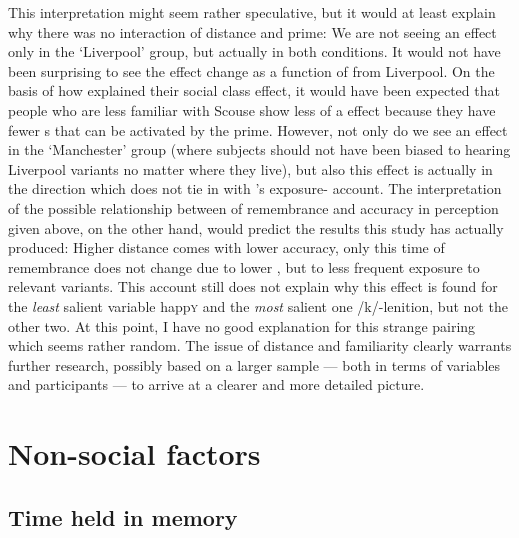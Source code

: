 This interpretation might seem rather speculative, but it would at least explain why there was no interaction of distance and prime: We are not seeing an effect only in the `Liverpool' group, but actually in both conditions.
It would not have been surprising to see the  effect change as a function of  from Liverpool.
On the basis of how \textcite{haydrager2010} explained their social class effect, it would have been expected that people who are less familiar with Scouse show less of a  effect because they have fewer s that can be activated by the prime.
However, not only do we see an effect in the `Manchester' group (where subjects should not have been biased to hearing Liverpool variants no matter where they live), but also this effect is actually in the direction which does not tie in with \citeauthor{haydrager2010}'s exposure- account.
The interpretation of the possible relationship between  of remembrance and accuracy in perception given above, on the other hand, would predict the results this study has actually produced: Higher distance comes with lower accuracy, only this time  of remembrance does not change due to lower , but to less frequent exposure to relevant variants.
This account still does not explain why this effect is found for the \emph{least} salient variable happ\textsc{y} and the \emph{most} salient one /k/-lenition, but not the other two.
At this point, I have no good explanation for this strange pairing which seems rather random.
The issue of distance and familiarity clearly warrants further research, possibly based on a larger sample --- both in terms of variables and participants --- to arrive at a clearer and more detailed picture.

	\section{Non-social factors}
		\label{sec.perc_res.disc.nonsocial}

		\subsection{Time held in memory}


